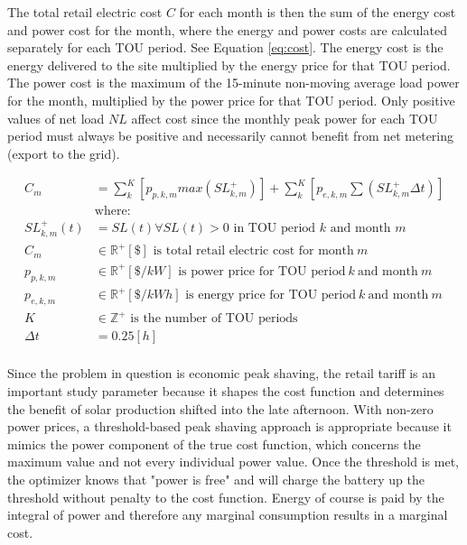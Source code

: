 \documentclass[journal,article,submit,pdftex,moreauthors]{Definitions/mdpi}
\begin{document}
  The total retail electric cost \(C\) for each month is then the sum of the energy cost and power cost for the month, where the energy and power costs are calculated separately for each TOU period. See Equation \ref{eq:cost}. The energy cost is the energy delivered to the site multiplied by the energy price for that TOU period. The power cost is the maximum of the 15-minute non-moving average load power for the month, multiplied by the power price for that TOU period. Only positive values of net load \(NL\) affect cost since the monthly peak power for each TOU period must always be positive and necessarily cannot benefit from net metering (export to the grid).

  \begin{equation}
    \label{eq:cost}
    \begin{split}
      C_m           & = \sum_k^K [p_{p,k,m}  max(SL^+_{k,m})] + \sum_k^K [p_{e,k,m} \sum (SL^+_{k,m}\Delta t) ]         \\
                    & \text{where:}                                                                             \\
      SL_{k,m}^+(t) & = SL(t) \forall SL(t)>0 \text{ in TOU period $k$ and month $m$}                           \\
      C_m           & \in \mathbb{R}^+ [\$] \text{ is total retail electric cost for month}\ m\                 \\
      p_{p,k,m}     & \in \mathbb{R}^+ [\$/kW] \text{ is power price for TOU period}\ k\ \text{and month}\ m\   \\
      p_{e,k,m}     & \in \mathbb{R}^+ [\$/kWh] \text{ is energy price for TOU period}\ k\ \text{and month}\ m\ \\
      K             & \in \mathbb{Z}^+ \text{ is the number of TOU periods} \\
      \Delta t      & = 0.25 [h] \\
    \end{split}
  \end{equation}

  Since the problem in question is economic peak shaving, the retail tariff is an important study parameter because it shapes the cost function and determines the benefit of solar production shifted into the late afternoon. With non-zero power prices, a threshold-based peak shaving approach is appropriate because it mimics the power component of the true cost function, which concerns the maximum value and not every individual power value. Once the threshold is met, the optimizer knows that "power is free" and will charge the battery up the threshold without penalty to the cost function. Energy of course is paid by the integral of power and therefore any marginal consumption results in a marginal cost.
\end{document}
